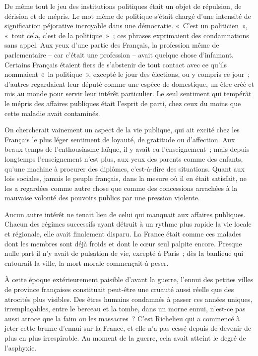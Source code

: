 \documentclass[french,twoside]{book} %
\begin{document}
De même tout le jeu des institutions politiques était un objet de répulsion, de dérision et de mépris. Le mot même de politique s'était chargé d'une intensité de signification péjorative incroyable dans une démocratie. « C'est un politicien », « tout cela, c'est de la politique » ; ces phrases exprimaient des condamnations sans appel. Aux yeux d'une partie des Français, la profession même de parlementaire – car c'était une profession – avait quelque chose d'infamant. Certains Français étaient fiers de s'abstenir de tout contact avec ce qu'ils nommaient « la politique », excepté le jour des élections, ou y compris ce jour ; d'autres regardaient leur député comme une espèce de domestique, un être créé et mis au monde pour servir leur intérêt particulier. Le seul sentiment qui tempérât le mépris des affaires publiques était l'esprit de parti, chez ceux du moins que cette maladie avait contaminés.\par
On chercherait vainement un aspect de la vie publique, qui ait excité chez les Français le plus léger sentiment de loyauté, de gratitude ou d'affection. Aux beaux temps de l'enthousiasme laïque, il y avait eu l'enseignement ; mais depuis longtemps l'enseignement n'est plus, aux yeux des parents comme des enfants, qu'une machine à procurer des diplômes, c'est-à-dire des situations. Quant aux lois sociales, jamais le peuple français, dans la mesure où il en était satisfait, ne les a regardées comme autre chose que comme des concessions arrachées à la mauvaise volonté des pouvoirs publics par une pression violente.\par
Aucun autre intérêt ne tenait lieu de celui qui manquait aux affaires publiques. Chacun des régimes successifs ayant détruit à un rythme plus rapide la vie locale et régionale, elle avait finalement disparu. La France était comme ces malades dont les membres sont déjà froids et dont le cœur seul palpite encore. Presque nulle part il n'y avait de pulsation de vie, excepté à Paris ; dès la banlieue qui entourait la ville, la mort morale commençait à peser.\par
À cette époque extérieurement paisible d'avant la guerre, l'ennui des petites villes de province françaises constituait peut-être une cruauté aussi réelle que des atrocités plus visibles. Des êtres humains condamnés à passer ces années uniques, irremplaçables, entre le berceau et la tombe, dans un morne ennui, n'est-ce pas aussi atroce que la faim ou les massacres ? C'est Richelieu qui a commencé à jeter cette brume d'ennui sur la France, et elle n'a pas cessé depuis de devenir de plus en plus irrespirable. Au moment de la guerre, cela avait atteint le degré de l'asphyxie.\par
\end{document}
